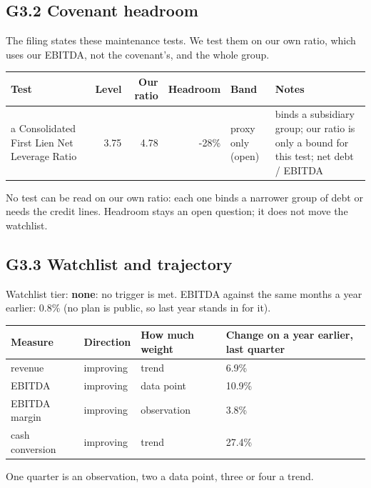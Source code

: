 \documentclass[11pt,a4paper]{article}
\begin{document}
\subsection*{G3.2 Covenant headroom}
The filing states these maintenance tests. We test them on our own ratio, which uses our EBITDA, not the covenant's, and the whole group.
\begin{center}\footnotesize\setlength{\tabcolsep}{3.5pt}\begin{tabular}{@{}p{3.8cm}rrrp{1.9cm}p{4.4cm}@{}}\toprule
Test & Level & Our ratio & Headroom & Band & Notes \\\midrule
a Consolidated First Lien Net Leverage Ratio & 3.75 & 4.78 & -28\% & proxy only (open) & binds a subsidiary group; our ratio is only a bound for this test; net debt / EBITDA \\
\bottomrule\end{tabular}\end{center}
No test can be read on our own ratio: each one binds a narrower group of debt or needs the credit lines. Headroom stays an open question; it does not move the watchlist.
\subsection*{G3.3 Watchlist and trajectory}
Watchlist tier: \textbf{none}: no trigger is met. EBITDA against the same months a year earlier: 0.8\% (no plan is public, so last year stands in for it).
\begin{center}\footnotesize\setlength{\tabcolsep}{3.5pt}\begin{tabular}{@{}llll@{}}\toprule
Measure & Direction & How much weight & Change on a year earlier, last quarter \\\midrule
revenue & improving & trend & 6.9\% \\
EBITDA & improving & data point & 10.9\% \\
EBITDA margin & improving & observation & 3.8\% \\
cash conversion & improving & trend & 27.4\% \\
\bottomrule\end{tabular}\end{center}
One quarter is an observation, two a data point, three or four a trend.
\end{document}
